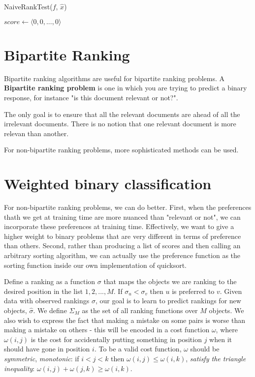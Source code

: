 \begin{algorithm}
    \caption{NaiveRankTest($f$, $\hat{x}$)}
    \label{alg:naive_rank_test}
$score \gets \langle 0, 0, ..., 0 \rangle$\;
\end{algorithm}

\section{Bipartite Ranking}
Bipartite ranking algorithms are useful for bipartite ranking problems. A \textbf{Bipartite ranking problem} is one in which you are trying to predict a binary response, for instance "is this document relevant or not?".

The only goal is to ensure that all the relevant documents are ahead of all the irrelevant documents. There is no notion that one relevant document is more relevan than another.

For non-bipartite ranking problems, more sophisticated methods can be used.

\section{Weighted binary classification}
For non-bipartite ranking problems, we can do better. First, when the preferences thath we get at training time are more nuanced than "relevant or not", we can incorporate these preferences at training time. Effectively, we want to give a higher weight to binary problems that are very different in terms of preference than others. Second, rather than producing a list of scores and then calling an arbitrary sorting algorithm, we can actually use the preference function as the sorting function inside our own implementation of quicksort.

Define a ranking as a function \(\sigma\) that maps the objects we are ranking to the desired position in the list \(1,2,...,M\). If \(\sigma_u < \sigma_v\) then \(u\) is preferred to \(v\). Given data with observed rankings \(\sigma\), our goal is to learn to predict rankings for new objects, \(\hat{\sigma}\). We define \(\Sigma_M\) as the set of all ranking functions over \(M\) objects. We also wish to express the fact that making a mistake on some pairs is worse than making a mistake on others - this will be encoded in a cost function \(\omega\), where \(\omega(i,j)\) is the cost for accidentally putting something in position \(j\) when it should have gone in position \(i\). To be a valid cost function, \(\omega\) should be \emph{symmetric}, \emph{monotonic}: if \(i < j < k\) then \(\omega(i,j) \leq \omega(i,k)\), \emph{satisfy the triangle inequality}: \(\omega(i,j) + \omega(j,k) \geq \omega(i,k)\).

